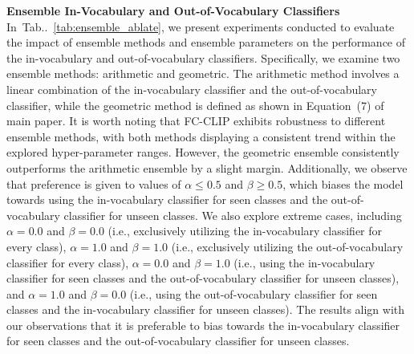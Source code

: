 \documentclass{article}
\makeatletter
\DeclareRobustCommand\onedot{\futurelet\@let@token\@onedot}
\def\@onedot{\ifx\@let@token.\else.\null\fi\xspace}
\newcommand{\tabref}[1]{Tab\onedot~\ref{#1}}
\newcommand{\modelname}{FC-CLIP\xspace}
\makeatother
\begin{document}
\noindent \textbf{Ensemble In-Vocabulary and Out-of-Vocabulary Classifiers}\quad
In~\tabref{tab:ensemble_ablate}, we present experiments conducted to evaluate the impact of ensemble methods and ensemble parameters on the performance of the in-vocabulary and out-of-vocabulary classifiers. Specifically, we examine two ensemble methods: arithmetic and geometric. The arithmetic method involves a linear combination of the in-vocabulary classifier and the out-of-vocabulary classifier, while the geometric method is defined as shown in Equation~(7) of main paper.
It is worth noting that \modelname exhibits robustness to different ensemble methods, with both methods displaying a consistent trend within the explored hyper-parameter ranges. However, the geometric ensemble consistently outperforms the arithmetic ensemble by a slight margin. Additionally, we observe that preference is given to values of $\alpha \leq 0.5$ and $\beta \geq 0.5$, which biases the model towards using the in-vocabulary classifier for seen classes and the out-of-vocabulary classifier for unseen classes.
We also explore extreme cases, including $\alpha=0.0$ and $\beta=0.0$ (i.e., exclusively utilizing the in-vocabulary classifier for every class), $\alpha=1.0$ and $\beta=1.0$ (i.e., exclusively utilizing the out-of-vocabulary classifier for every class), $\alpha=0.0$ and $\beta=1.0$ (i.e., using the in-vocabulary classifier for seen classes and the out-of-vocabulary classifier for unseen classes), and $\alpha=1.0$ and $\beta=0.0$ (i.e., using the out-of-vocabulary classifier for seen classes and the in-vocabulary classifier for unseen classes). The results align with our observations that it is preferable to bias towards the in-vocabulary classifier for seen classes and the out-of-vocabulary classifier for unseen classes.
\end{document}
